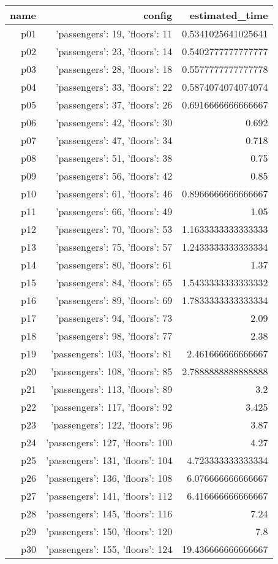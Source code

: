 \documentclass{article}
\begin{document}
                            \begin{center}
                            \scriptsize
                            \begin{tabular}{r|r|r}
                            name & config & estimated\_time\\\midrule
                              p01&{'passengers': 19, 'floors': 11}&0.5341025641025641\\
  p02&{'passengers': 23, 'floors': 14}&0.5402777777777777\\
  p03&{'passengers': 28, 'floors': 18}&0.5577777777777778\\
  p04&{'passengers': 33, 'floors': 22}&0.5874074074074074\\
  p05&{'passengers': 37, 'floors': 26}&0.6916666666666667\\
  p06&{'passengers': 42, 'floors': 30}&0.692\\
  p07&{'passengers': 47, 'floors': 34}&0.718\\
  p08&{'passengers': 51, 'floors': 38}&0.75\\
  p09&{'passengers': 56, 'floors': 42}&0.85\\
  p10&{'passengers': 61, 'floors': 46}&0.8966666666666667\\
  p11&{'passengers': 66, 'floors': 49}&1.05\\
  p12&{'passengers': 70, 'floors': 53}&1.1633333333333333\\
  p13&{'passengers': 75, 'floors': 57}&1.2433333333333334\\
  p14&{'passengers': 80, 'floors': 61}&1.37\\
  p15&{'passengers': 84, 'floors': 65}&1.5433333333333332\\
  p16&{'passengers': 89, 'floors': 69}&1.7833333333333334\\
  p17&{'passengers': 94, 'floors': 73}&2.09\\
  p18&{'passengers': 98, 'floors': 77}&2.38\\
  p19&{'passengers': 103, 'floors': 81}&2.461666666666667\\
  p20&{'passengers': 108, 'floors': 85}&2.7888888888888888\\
  p21&{'passengers': 113, 'floors': 89}&3.2\\
  p22&{'passengers': 117, 'floors': 92}&3.425\\
  p23&{'passengers': 122, 'floors': 96}&3.87\\
  p24&{'passengers': 127, 'floors': 100}&4.27\\
  p25&{'passengers': 131, 'floors': 104}&4.723333333333334\\
  p26&{'passengers': 136, 'floors': 108}&6.076666666666667\\
  p27&{'passengers': 141, 'floors': 112}&6.416666666666667\\
  p28&{'passengers': 145, 'floors': 116}&7.24\\
  p29&{'passengers': 150, 'floors': 120}&7.8\\
  p30&{'passengers': 155, 'floors': 124}&19.436666666666667
                            \end{tabular}
                            \end{center}
                    
\end{document}
